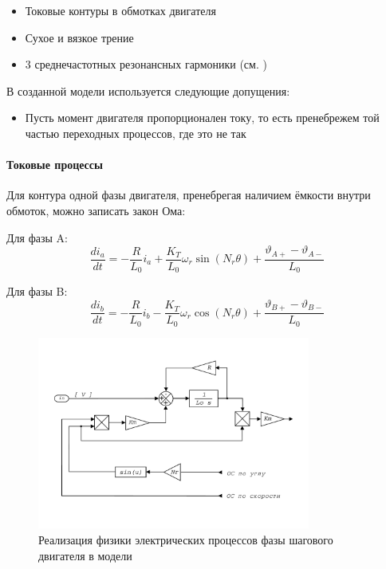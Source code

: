 \begin{itemize}
    \item Токовые контуры в обмотках двигателя
    \item Сухое и вязкое трение
    \item 3 среднечастотных резонансных гармоники (см. \cite{Novel_Modeling_and_Damping})
\end{itemize}

В созданной модели используется следующие допущения:

\begin{itemize}
    \item Пусть момент двигателя пропорционален току, то есть пренебрежем той частью переходных
            процессов, где это не так
\end{itemize}

\paragraph{ Токовые процессы }
Для контура одной фазы двигателя, пренебрегая наличием ёмкости внутри обмоток, можно записать
закон Ома:

Для фазы A:
\begin{equation}
    \frac{di_{a}}{dt} =
        - \frac{R}{L_{0}} i_{a}
        + \frac{K_{T}}{L_{0}} \omega_{r} \sin(N_{r}\theta)
        + \frac{\vartheta_{A+} - \vartheta_{A-}}{L_{0}}
\end{equation}

Для фазы B:
\begin{equation}
    \frac{di_{b}}{dt} =
        - \frac{R}{L_{0}} i_{b}
        - \frac{K_{T}}{L_{0}} \omega_{r} \cos(N_{r}\theta)
        + \frac{\vartheta_{B+} - \vartheta_{B-}}{L_{0}}
\end{equation}
\begin{figure}[ht!]
    \centering
    \includegraphics[width=0.8\textwidth, keepaspectratio]
                    {./src/pictures/drive_model/drive_model_current_equation}
    \caption{Реализация физики электрических процессов фазы шагового двигателя в модели}
    \label{pic_drive_model_current_equation}
\end{figure}

